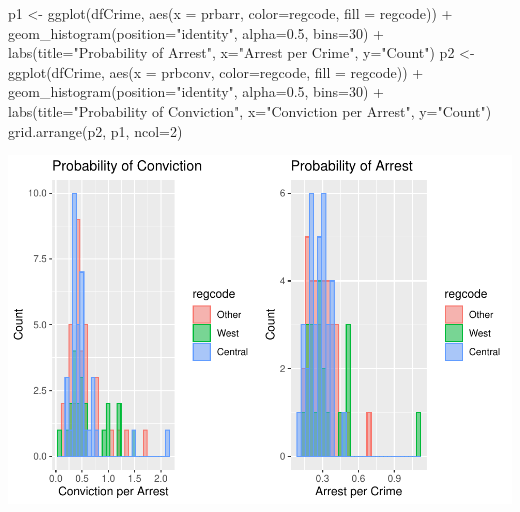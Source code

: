 \documentclass[]{article}
\newenvironment{Shaded}{}{}
\newcommand{\DataTypeTok}[1]{#1}
\newcommand{\DecValTok}[1]{#1}
\newcommand{\FloatTok}[1]{#1}
\newcommand{\KeywordTok}[1]{\textcolor[rgb]{0.00,0.00,1.00}{#1}}
\newcommand{\NormalTok}[1]{#1}
\newcommand{\OperatorTok}[1]{#1}
\newcommand{\StringTok}[1]{\textcolor[rgb]{0.00,0.50,0.50}{#1}}
\begin{document}
\begin{Shaded}
\begin{Highlighting}[]
\NormalTok{p1 <-}\StringTok{ }\KeywordTok{ggplot}\NormalTok{(dfCrime, }\KeywordTok{aes}\NormalTok{(}\DataTypeTok{x =}\NormalTok{ prbarr, }\DataTypeTok{color=}\NormalTok{regcode, }\DataTypeTok{fill =}\NormalTok{ regcode)) }\OperatorTok{+}
\StringTok{  }\KeywordTok{geom_histogram}\NormalTok{(}\DataTypeTok{position=}\StringTok{"identity"}\NormalTok{, }\DataTypeTok{alpha=}\FloatTok{0.5}\NormalTok{, }\DataTypeTok{bins=}\DecValTok{30}\NormalTok{) }\OperatorTok{+}
\StringTok{  }\KeywordTok{labs}\NormalTok{(}\DataTypeTok{title=}\StringTok{"Probability of Arrest"}\NormalTok{, }\DataTypeTok{x=}\StringTok{"Arrest per Crime"}\NormalTok{, }\DataTypeTok{y=}\StringTok{"Count"}\NormalTok{)}
\NormalTok{p2 <-}\StringTok{ }\KeywordTok{ggplot}\NormalTok{(dfCrime, }\KeywordTok{aes}\NormalTok{(}\DataTypeTok{x =}\NormalTok{ prbconv, }\DataTypeTok{color=}\NormalTok{regcode, }\DataTypeTok{fill =}\NormalTok{ regcode)) }\OperatorTok{+}
\StringTok{  }\KeywordTok{geom_histogram}\NormalTok{(}\DataTypeTok{position=}\StringTok{"identity"}\NormalTok{, }\DataTypeTok{alpha=}\FloatTok{0.5}\NormalTok{, }\DataTypeTok{bins=}\DecValTok{30}\NormalTok{) }\OperatorTok{+}
\StringTok{  }\KeywordTok{labs}\NormalTok{(}\DataTypeTok{title=}\StringTok{"Probability of Conviction"}\NormalTok{, }\DataTypeTok{x=}\StringTok{"Conviction per Arrest"}\NormalTok{, }\DataTypeTok{y=}\StringTok{"Count"}\NormalTok{)}
\KeywordTok{grid.arrange}\NormalTok{(p2, p1, }\DataTypeTok{ncol=}\DecValTok{2}\NormalTok{)}
\end{Highlighting}
\end{Shaded}

\includegraphics{Bagnard_Gaustad_Hartman_Leung_Lab_3_files/figure-latex/unnamed-chunk-48-1.pdf}
\end{document}
